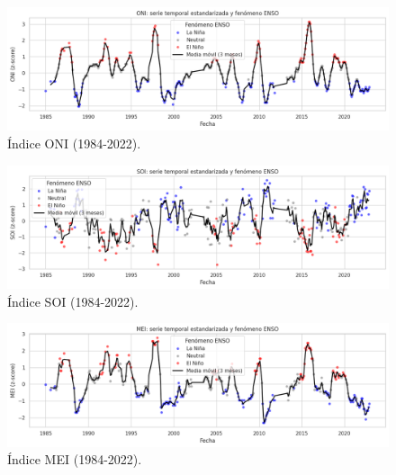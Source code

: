 \begin{figure}[ht]
        \centering
        \includegraphics[scale=.45]
        {Figures/fig17_ts_oni.png}
        \caption{Índice ONI (1984-2022).}
        \label{fig:indice_oni_ts}
\end{figure}

\begin{figure}[ht]
        \centering
        \includegraphics[scale=.45]
        {Figures/fig18_ts_soi.png}
        \caption{Índice SOI (1984-2022).}
        \label{fig:indice_soi_ts}
\end{figure}

\begin{figure}[ht]
        \centering
        \includegraphics[scale=.45]
        {Figures/fig19_ts_mei.png}
        \caption{Índice MEI (1984-2022).}
        \label{fig:indice_mei_ts}
\end{figure}
\newpage


